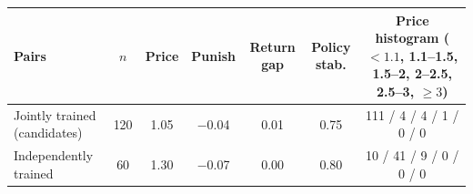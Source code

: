 \begin{tabular}{lcccccc}
\toprule
Pairs & $n$ & Price & Punish & Return gap & Policy stab. & Price histogram ($<1.1$, 1.1--1.5, 1.5--2, 2--2.5, 2.5--3, $\ge 3$) \\
\midrule
Jointly trained (candidates) & 120 & 1.05 & $-$0.04 & 0.01 & 0.75 & 111 / 4 / 4 / 1 / 0 / 0 \\
Independently trained & 60 & 1.30 & $-$0.07 & 0.00 & 0.80 & 10 / 41 / 9 / 0 / 0 / 0 \\
\bottomrule
\end{tabular}
